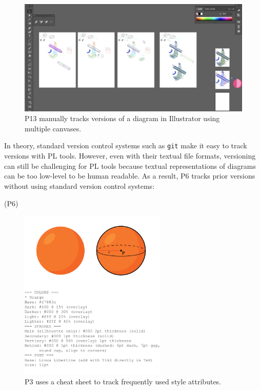 \begin{figure}[t]
    \centering
    \includegraphics[width=15cm]{assets/interviews/MultipleCanvases.png}
    \caption{P13 manually tracks versions of a diagram in Illustrator using multiple canvases.}
    \label{fig:multiple}
\end{figure}

In theory, standard version control systems such as \texttt{git} \cite{git} make it easy to track versions with PL tools. However, even with their textual file formats, versioning can still be challenging for PL tools because textual representations of diagrams can be too low-level to be human readable. As a result, P6 tracks prior versions without using standard version control systems:
    
     (P6)
    

\begin{figure}[ht]
    \centering
    \includegraphics[width=7cm]{assets/interviews/cheatsheet.pdf}
    \caption{P3 uses a cheat sheet to track frequently used style attributes.}
    \label{fig:cheatsheet}
\end{figure}
    
